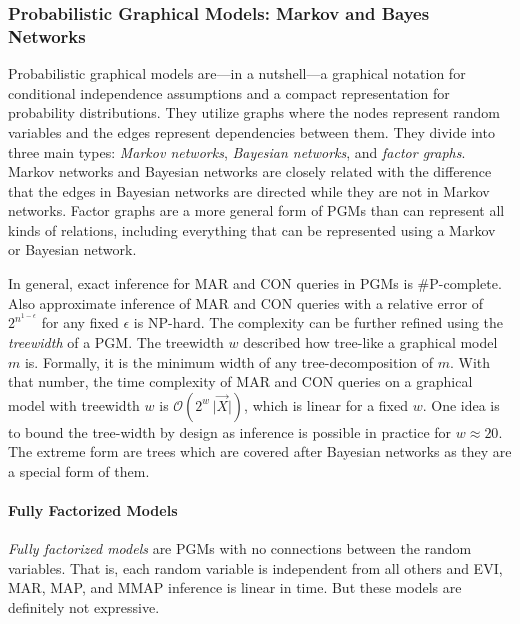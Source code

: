 			\subsubsection{Probabilistic Graphical Models: Markov and Bayes Networks}
				Probabilistic graphical models are---in a nutshell---a graphical notation for conditional independence assumptions and a compact representation for probability distributions. They utilize graphs where the nodes represent random variables and the edges represent dependencies between them. They divide into three main types: \emph{Markov networks}, \emph{Bayesian networks}, and \emph{factor graphs}. Markov networks and Bayesian networks are closely related with the difference that the edges in Bayesian networks are directed while they are not in Markov networks. Factor graphs are a more general form of PGMs than can represent all kinds of relations, including everything that can be represented using a Markov or Bayesian network.

				In general, exact inference for MAR and CON queries in PGMs is \(\mathrm{\#P}\)-complete. Also approximate inference of MAR and CON queries with a relative error of \( 2^{n^{1 - \epsilon}} \) for any fixed \(\epsilon\) is \(\mathrm{NP}\)-hard. The complexity can be further refined using the \emph{treewidth} of a PGM. The treewidth \(w\) described how tree-like a graphical model \(m\) is. Formally, it is the minimum width of any tree-decomposition of \(m\). With that number, the time complexity of MAR and CON queries on a graphical model with treewidth \(w\) is \( \mathcal{O}(2^w \, \lvert \vec{X} \rvert) \), which is linear for a fixed \(w\). One idea is to bound the tree-width by design as inference is possible in practice for \( w \approx 20 \). The extreme form are trees which are covered after Bayesian networks as they are a special form of them.

				\paragraph{Fully Factorized Models}
					\emph{Fully factorized models} are PGMs with no connections between the random variables. That is, each random variable is independent from all others and EVI, MAR, MAP, and MMAP inference is linear in time. But these models are definitely not expressive.

